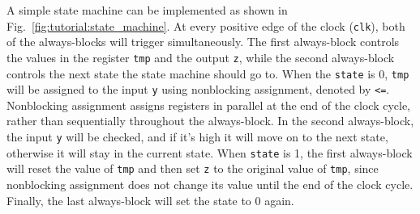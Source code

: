 A simple state machine can be implemented as shown in Fig.~\ref{fig:tutorial:state_machine}.
At every positive edge of the clock (\texttt{clk}), both of the always-blocks will trigger simultaneously.  The first always-block controls the values in the register \texttt{tmp} and the output \texttt{z}, while the second always-block controls the next state the state machine should go to.  When the \texttt{state} is 0, \texttt{tmp} will be assigned to the input \texttt{y} using nonblocking assignment, denoted by \texttt{<=}.  Nonblocking assignment assigns registers in parallel at the end of the clock cycle, rather than sequentially throughout the always-block. In the second always-block, the input \texttt{y} will be checked, and if it's high it will move on to the next state, otherwise it will stay in the current state.  When \texttt{state} is 1, the first always-block will reset the value of \texttt{tmp} and then set \texttt{z} to the original value of \texttt{tmp}, since nonblocking assignment does not change its value until the end of the clock cycle.  Finally, the last always-block will set the state to 0 again.

